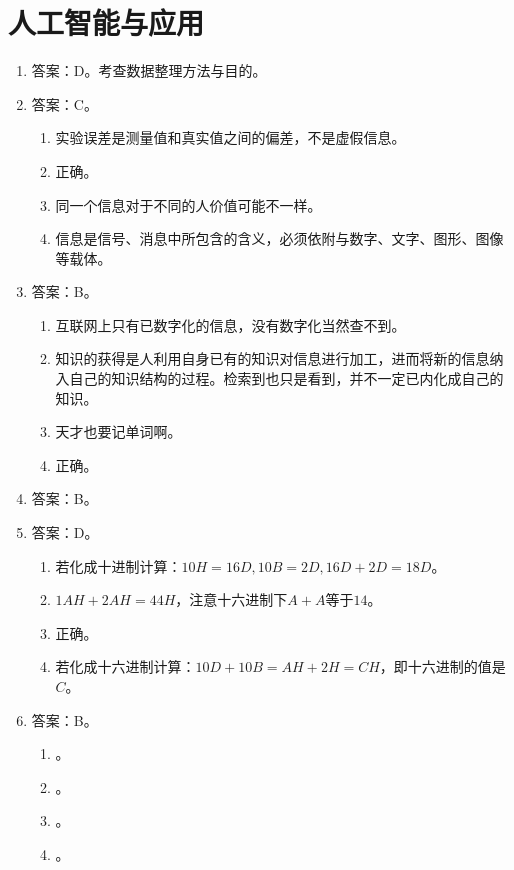 \section{人工智能与应用}

\begin{enumerate}
\item 答案：D。考查数据整理方法与目的。

\item 答案：C。
	\begin{enumerate}[label=\Alph*.]
	\item 实验误差是测量值和真实值之间的偏差，不是虚假信息。
	\item 正确。
	\item 同一个信息对于不同的人价值可能不一样。
	\item 信息是信号、消息中所包含的含义，必须依附与数字、文字、图形、图像等载体。
	\end{enumerate}

\item 答案：B。
	\begin{enumerate}[label=\Alph*.]
	\item 互联网上只有已数字化的信息，没有数字化当然查不到。
	\item 知识的获得是人利用自身已有的知识对信息进行加工，进而将新的信息纳入自己的知识结构的过程。检索到也只是看到，并不一定已内化成自己的知识。
	\item 天才也要记单词啊。
	\item 正确。
	\end{enumerate}

\item 答案：B。

\item 答案：D。
	\begin{enumerate}[label=\Alph*.]
	\item 若化成十进制计算：$10H=16D, 10B = 2D, 16D+2D=18D$。
	\item $1AH + 2AH = 44H$，注意十六进制下$A + A$等于$14$。
	\item 正确。
	\item 若化成十六进制计算：$10D + 10B = AH + 2H = CH$，即十六进制的值是$C$。
	\end{enumerate}

\item 答案：B。
	\begin{enumerate}[label=\Alph*.]
	\item 。
	\item 。
	\item 。
	\item 。
	\end{enumerate}


\end{enumerate}
